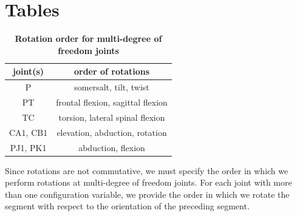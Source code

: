 \documentclass[10pt]{article}
\begin{document}
\section*{Tables}

\begin{table}[!ht]
\caption{
\bf{Rotation order for multi-degree of freedom joints}}
\begin{tabular}{|c|c|}
    \hline
    \textbf{joint(s)} & \textbf{order of rotations}\\
    \hline
    P & somersalt, tilt, twist \\
    \hline
    PT & frontal flexion, sagittal flexion \\
    \hline
    TC & torsion, lateral spinal flexion \\
    \hline
    CA1, CB1 & elevation, abduction, rotation \\
    \hline
    PJ1, PK1 & abduction, flexion \\
    \hline
\end{tabular}
\begin{flushleft}Since rotations are not commutative, we must specify the order
    in which we perform rotations at multi-degree of freedom joints. For each
    joint with more than one configuration variable, we provide the order in
    which we rotate the segment with respect to the orientation of the
    preceding segment.
\end{flushleft}
\label{tab:dof}
 \end{table}
\end{document}
